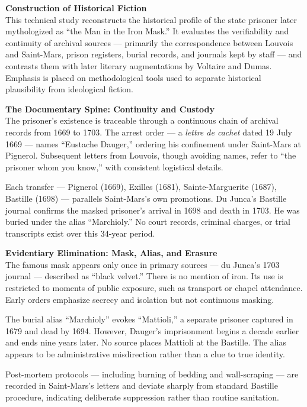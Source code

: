 \begin{technical}
{\Large\textbf{Construction of Historical Fiction}}\\[0.2em]

This technical study reconstructs the historical profile of the state prisoner later mythologized as “the Man in the Iron Mask.” It evaluates the verifiability and continuity of archival sources — primarily the correspondence between Louvois and Saint-Mars, prison registers, burial records, and journals kept by staff — and contrasts them with later literary augmentations by Voltaire and Dumas. Emphasis is placed on methodological tools used to separate historical plausibility from ideological fiction.

\textbf{The Documentary Spine: Continuity and Custody}\\[0.3em]
The prisoner’s existence is traceable through a continuous chain of archival records from 1669 to 1703. The arrest order — a \textit{lettre de cachet} dated 19 July 1669 — names “Eustache Dauger,” ordering his confinement under Saint-Mars at Pignerol. Subsequent letters from Louvois, though avoiding names, refer to “the prisoner whom you know,” with consistent logistical details.

Each transfer — Pignerol (1669), Exilles (1681), Sainte-Marguerite (1687), Bastille (1698) — parallels Saint-Mars’s own promotions. Du Junca’s Bastille journal confirms the masked prisoner’s arrival in 1698 and death in 1703. He was buried under the alias “Marchioly.” No court records, criminal charges, or trial transcripts exist over this 34-year period.

\textbf{Evidentiary Elimination: Mask, Alias, and Erasure}\\[0.3em]
The famous mask appears only once in primary sources — du Junca’s 1703 journal — described as “black velvet.” There is no mention of iron. Its use is restricted to moments of public exposure, such as transport or chapel attendance. Early orders emphasize secrecy and isolation but not continuous masking.

The burial alias “Marchioly” evokes “Mattioli,” a separate prisoner captured in 1679 and dead by 1694. However, Dauger’s imprisonment begins a decade earlier and ends nine years later. No source places Mattioli at the Bastille. The alias appears to be administrative misdirection rather than a clue to true identity.

Post-mortem protocols — including burning of bedding and wall-scraping — are recorded in Saint-Mars’s letters and deviate sharply from standard Bastille procedure, indicating deliberate suppression rather than routine sanitation.


\end{technical}
